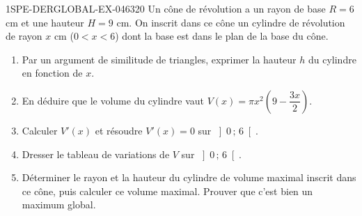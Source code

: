 \begin{exercice}{1SPE-DERGLOBAL-EX-046}{3}{20}
Un cône de révolution a un rayon de base $R = 6$ cm et une hauteur $H = 9$ cm.
On inscrit dans ce cône un cylindre de révolution de rayon $x$ cm ($0 < x < 6$)
dont la base est dans le plan de la base du cône.

\begin{enumerate}
  \item Par un argument de similitude de triangles, exprimer la hauteur $h$ du cylindre
        en fonction de $x$.
  \item En déduire que le volume du cylindre vaut $V(x) = \pi x^2\!\left(9 - \dfrac{3x}{2}\right)$.
  \item Calculer $V'(x)$ et résoudre $V'(x) = 0$ sur $\left]0\,;\,6\right[$.
  \item Dresser le tableau de variations de $V$ sur $\left]0\,;\,6\right[$.
  \item Déterminer le rayon et la hauteur du cylindre de volume maximal inscrit dans ce cône,
        puis calculer ce volume maximal. Prouver que c'est bien un maximum global.
\end{enumerate}
\end{exercice}

